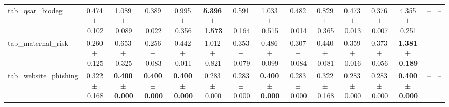\documentclass[8pt]{extarticle}
\begin{document}
\begin{longtable}{l*{14}{c}}
tab\_qsar\_biodeg & 0.474\,$\pm$\,0.102 & 1.089\,$\pm$\,0.089 & 0.389\,$\pm$\,0.022 & 0.995\,$\pm$\,0.356 & \textbf{5.396\,$\pm$\,1.573} & 0.591\,$\pm$\,0.164 & 1.033\,$\pm$\,0.515 & 0.482\,$\pm$\,0.014 & 0.829\,$\pm$\,0.365 & 0.473\,$\pm$\,0.013 & 0.376\,$\pm$\,0.007 & 4.355\,$\pm$\,0.251 & -- & -- \\
tab\_maternal\_risk & 0.260\,$\pm$\,0.125 & 0.653\,$\pm$\,0.325 & 0.256\,$\pm$\,0.083 & 0.442\,$\pm$\,0.011 & 1.012\,$\pm$\,0.821 & 0.353\,$\pm$\,0.079 & 0.486\,$\pm$\,0.099 & 0.307\,$\pm$\,0.084 & 0.440\,$\pm$\,0.081 & 0.359\,$\pm$\,0.016 & 0.373\,$\pm$\,0.056 & \textbf{1.381\,$\pm$\,0.189} & -- & -- \\
tab\_website\_phishing & 0.322\,$\pm$\,0.168 & \textbf{0.400\,$\pm$\,0.000} & \textbf{0.400\,$\pm$\,0.000} & \textbf{0.400\,$\pm$\,0.000} & 0.283\,$\pm$\,0.000 & 0.283\,$\pm$\,0.000 & \textbf{0.400\,$\pm$\,0.000} & 0.283\,$\pm$\,0.000 & 0.322\,$\pm$\,0.168 & 0.283\,$\pm$\,0.000 & 0.283\,$\pm$\,0.000 & \textbf{0.400\,$\pm$\,0.000} & -- & -- \\
\end{longtable}
\end{document}
